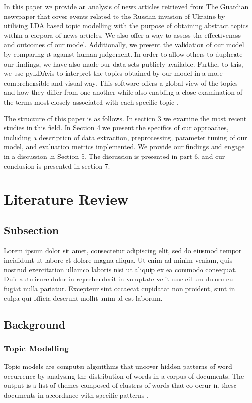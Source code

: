 \documentclass[twoside,12pt,a4paper]{article}
\begin{document}
In this paper we provide an analysis of news articles retrieved from The Guardian newspaper that cover events related to the Russian invasion of Ukraine by utilising LDA based topic modelling with the purpose of obtaining abstract topics within a corpora of news articles. We also offer a way to assess the effectiveness and outcomes of our model. Additionally, we present the validation of our model by comparing it against human judgement. In order to allow others to duplicate our findings, we have also made our data sets publicly available. Further to this, we use pyLDAvis to interpret the topics obtained by our model in a more comprehensible and visual way. This software offers a global view of the topics and how they differ from one another while also enabling a close examination of the terms most closely associated with each specific topic \citep{sievert_ldavis_2014}.

The structure of this paper is as follows. In section 3 we examine the most recent studies in this field. In Section 4 we present the specifics of our approaches, including a description of data extraction, preprocessing, parameter tuning of our model, and evaluation metrics implemented. We provide our findings and engage in a discussion in Section 5. The discussion is presented in part 6, and our conclusion is presented in section 7.

\clearpage
\section{Literature Review}
\subsection{Subsection}
Lorem ipsum dolor sit amet, consectetur adipiscing elit, sed do eiusmod tempor incididunt ut labore et dolore magna aliqua. Ut enim ad minim veniam, quis nostrud exercitation ullamco laboris nisi ut aliquip ex ea commodo consequat. Duis aute irure dolor in reprehenderit in voluptate velit esse cillum dolore eu fugiat nulla pariatur. Excepteur sint occaecat cupidatat non proident, sunt in culpa qui officia deserunt mollit anim id est laborum.

\subsection{Background}
\subsubsection{Topic Modelling}
Topic models are computer algorithms that uncover hidden patterns of word occurrence by analysing the distribution of words in a corpus of documents. The output is a list of themes composed of clusters of words that co-occur in these documents in accordance with specific patterns \citep{jacobi_quantitative_2016}. 
\end{document}
